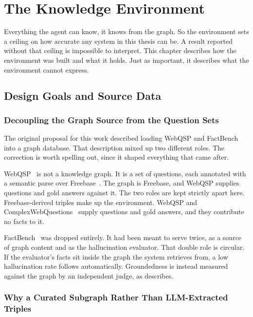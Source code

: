 \chapter{The Knowledge Environment}\label{ch:environment}

Everything the agent can know, it knows from the graph. So the environment sets
a ceiling on how accurate any system in this thesis can be. A result reported
without that ceiling is impossible to interpret. This chapter describes how the
environment was built and what it holds. Just as important, it describes what
the environment cannot express.

\section{Design Goals and Source Data}\label{sec:env-goals}

\subsection{Decoupling the Graph Source from the Question Sets}

The original proposal for this work described loading WebQSP and FactBench into
a graph database. That description mixed up two different roles. The correction
is worth spelling out, since it shaped everything that came after.

WebQSP~\cite{yih2016value} is not a knowledge graph. It is a set of questions,
each annotated with a semantic parse over Freebase~\cite{bollacker2008freebase}.
The graph is Freebase, and WebQSP supplies questions and gold answers against
it. The two roles are kept strictly apart here. Freebase-derived triples make up
the environment. WebQSP and ComplexWebQuestions~\cite{talmor2018web} supply
questions and gold answers, and they contribute no facts to it.

FactBench~\cite{bayat2025factbench} was dropped entirely. It had been meant to
serve twice, as a source of graph content and as the hallucination evaluator.
That double role is circular. If the evaluator's facts sit inside the graph the
system retrieves from, a low hallucination rate follows automatically.
Groundedness is instead measured against the graph by an independent judge, as
 describes.

\subsection{Why a Curated Subgraph Rather Than LLM-Extracted Triples}


